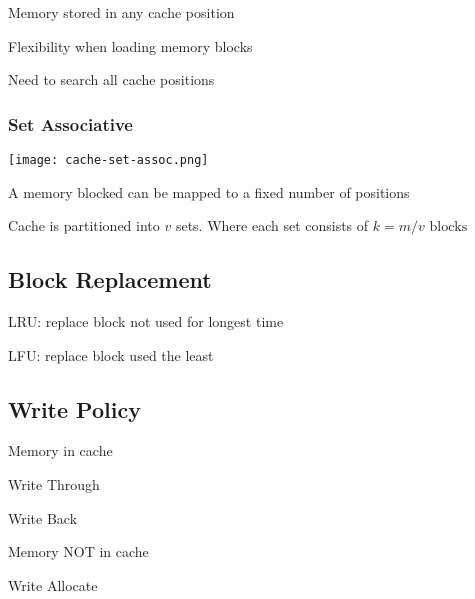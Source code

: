 \documentclass[12pt]{article}
\begin{document}
\begin{spacing}{1.5}
\begin{itemize*}
	\item Memory stored in any cache position
	\item Flexibility when loading memory blocks
	\item Need to search all cache positions
\end{itemize*}

\subsubsection{Set Associative}

\begin{center}
	\texttt{[image: cache-set-assoc.png]}
\end{center}

\begin{itemize*}
	\item A memory blocked can be mapped to a fixed number of positions
	\item Cache is partitioned into $v$ sets. Where each set consists of $k = m/v \textrm{ blocks}$
\end{itemize*}

\subsection{Block Replacement}

\begin{itemize*}
	\item LRU: replace block not used for longest time
	\item LFU: replace block used the least
\end{itemize*}


\subsection{Write Policy}

\begin{itemize*}
	\item Memory in cache
		\begin{itemize*}
			\item Write Through
			\item Write Back
		\end{itemize*}
	\item Memory NOT in cache
		\begin{itemize*}
			\item Write Allocate
		\end{itemize*}
\end{itemize*}


\end{spacing}
\end{document}
